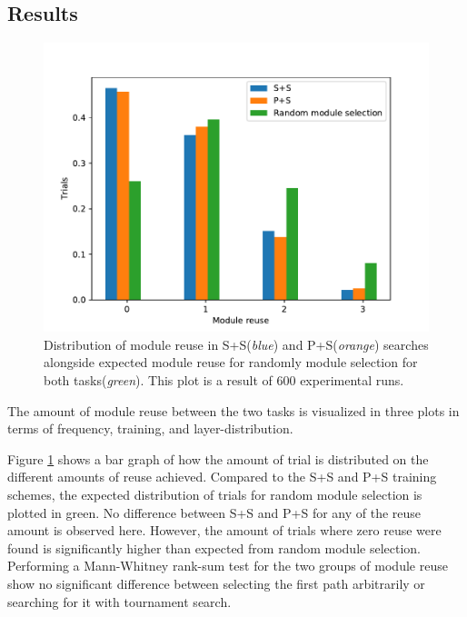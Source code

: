 \subsection{Results}
\label{exp1:BIN.results}
\begin{figure}[t]
    \includegraphics[width=\textwidth]{Chapters/4.Experiments/exp1/figures/BIN_module_reuse_bargraph.pdf}
    \caption[Module reuse for binary MNIST classification]{Distribution of module reuse in S+S(\textit{blue}) and P+S(\textit{orange}) searches alongside expected module reuse for randomly module selection for both tasks(\textit{green}). This plot is a result of 600 experimental runs.}
    \label{fig:binMNIST.hist}
\end{figure}

The amount of module reuse between the two tasks is visualized in three plots in terms of frequency, training, and layer-distribution.

Figure \ref{fig:binMNIST.hist} shows a bar graph of how the amount of trial is distributed on the different amounts of reuse achieved. Compared to the S+S and P+S training schemes, the expected distribution of trials for random module selection is plotted in green. No difference between S+S and P+S for any of the reuse amount is observed here. However, the amount of trials where zero reuse were found is significantly higher than expected from random module selection. Performing a Mann-Whitney rank-sum test for the two groups of module reuse show no significant difference between selecting the first path arbitrarily or searching for it with tournament search. 

